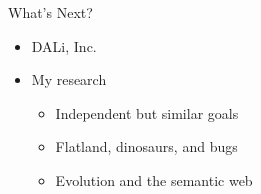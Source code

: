 \documentclass[%
final,
slideColor,
nototal,
nocolorBG,
pdf,
accumulate,
next,
]{prosper}
\begin{document}
\begin{slide}{What's Next?}
  \begin{itemize}
  \item DALi, Inc.
  \item My research
    \begin{itemize}
    \item Independent but similar goals
    \item Flatland, dinosaurs, and bugs
    \item Evolution and the semantic web
    \end{itemize}
  \end{itemize}
\end{slide}

\end{document}
